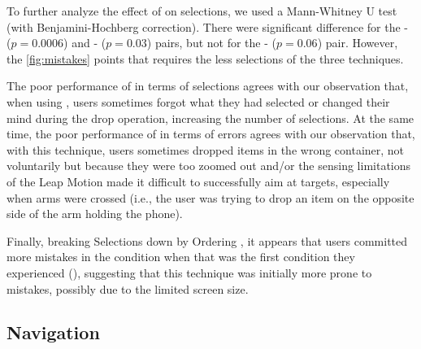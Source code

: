 To further analyze the effect of  on selections, we used a Mann-Whitney U test (with Benjamini-Hochberg correction). There were significant difference for the  -  ($p = 0.0006$) and  -  ($p = 0.03$) pairs, but not for the  -  ($p = 0.06$) pair. However, the \autoref{fig:mistakes} points that   requires the less selections of the three techniques.

The poor performance of  in terms of selections agrees with our observation that, when using , users sometimes forgot what they had selected or changed their mind during the drop operation, increasing the number of selections. At the same time, the poor performance of  in terms of errors agrees with our observation that, with this technique, users sometimes dropped items in the wrong container, not voluntarily but because they were too zoomed out and/or the sensing limitations of the Leap Motion made it difficult to successfully aim at targets, especially when arms were crossed (i.e., the user was trying to drop an item on the opposite side of the arm holding the phone).

Finally, breaking Selections down by Ordering , it appears that users committed more mistakes in the  condition when that was the first condition they experienced (), suggesting that this technique was initially more prone to mistakes, possibly due to the limited screen size.


\subsection{Navigation}
\label{subsec:experiment_results_navigation}

